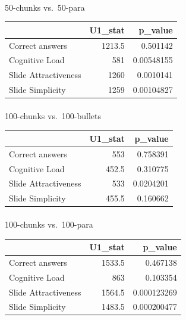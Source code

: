 \documentclass[
  letterpaper,
  DIV=11,
  numbers=noendperiod]{scrartcl}
\makeatletter
\let\oldparagraph\paragraph
\renewcommand{\paragraph}{
    \@ifstar
      \xxxParagraphStar
      \xxxParagraphNoStar
  }
\newcommand{\xxxParagraphStar}[1]{\oldparagraph*{#1}\mbox{}}
\newcommand{\xxxParagraphNoStar}[1]{\oldparagraph{#1}\mbox{}}
\newcounter{none} %
\makeatother
\begin{document}
\paragraph{50-chunks vs.~50-para}\label{chunks-vs.-50-para}

{\def\LTcaptype{none} %
\begin{longtable}[]{@{}lrr@{}}
\toprule\noalign{}
& U1\_stat & p\_value \\
\midrule\noalign{}
\endhead
\bottomrule\noalign{}
\endlastfoot
Correct answers & 1213.5 & 0.501142 \\
Cognitive Load & 581 & 0.00548155 \\
Slide Attractiveness & 1260 & 0.0010141 \\
Slide Simplicity & 1259 & 0.00104827 \\
\end{longtable}
}

\paragraph{100-chunks vs.~100-bullets}\label{chunks-vs.-100-bullets}

{\def\LTcaptype{none} %
\begin{longtable}[]{@{}lrr@{}}
\toprule\noalign{}
& U1\_stat & p\_value \\
\midrule\noalign{}
\endhead
\bottomrule\noalign{}
\endlastfoot
Correct answers & 553 & 0.758391 \\
Cognitive Load & 452.5 & 0.310775 \\
Slide Attractiveness & 533 & 0.0204201 \\
Slide Simplicity & 455.5 & 0.160662 \\
\end{longtable}
}

\paragraph{100-chunks vs.~100-para}\label{chunks-vs.-100-para}

{\def\LTcaptype{none} %
\begin{longtable}[]{@{}lrr@{}}
\toprule\noalign{}
& U1\_stat & p\_value \\
\midrule\noalign{}
\endhead
\bottomrule\noalign{}
\endlastfoot
Correct answers & 1533.5 & 0.467138 \\
Cognitive Load & 863 & 0.103354 \\
Slide Attractiveness & 1564.5 & 0.000123269 \\
Slide Simplicity & 1483.5 & 0.000200477 \\
\end{longtable}
}
\end{document}

